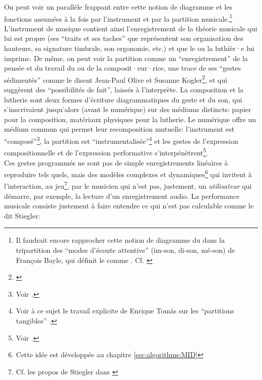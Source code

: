 \indent On peut voir un parallèle frappant entre cette notion de diagramme et les fonctions assumées à la fois par l'instrument et par la partition musicale.\footnote{Il faudrait encore rapprocher cette notion de diagramme du  dans la tripartition des ``modes d'écoute attentive'' (im-son, di-son, mé-son) de François Bayle, qui définit le  comme . Cf. \cite{bayle_musique_1993}} L'instrument de musique contient ainsi l'enregistrement de la théorie musicale qui lui est propre (ses ``traits et ses taches'' que représentent son organisation des hauteurs, sa signature timbrale, son ergonomie, etc.) et que le ou la luthièr·e lui imprime. De même, on peut voir la partition comme un ``enregistrement'' de la pensée et du travail du ou de la composit·eur·rice, une trace de ses ``gestes sédimentés'' comme le disent Jean-Paul Olive et Susanne Kogler\footnote{\cite{olive_expression_2013}}, et qui suggèrent des ``possibilités de fait'', laissés à l'interprète. La composition et la lutherie sont deux formes d’écriture diagrammatiques du geste et du son, qui s’inscrivaient jusqu’alors (avant le numérique) sur des médiums distincts: papier pour la composition, matériaux physiques pour la lutherie. Le numérique offre un médium commun qui permet leur recomposition mutuelle: l'instrument est ``composé''\footnote{Voir \cite{schnell_introducing_2002}.}, la partition est ``instrumentalisée''\footnote{Voir à ce sujet le travail explicite de Enrique Tomás sur les ``partitions tangibles'' \cite{tomas_tangible_2014}.} et les gestes de l'expression compositionnelle et de l'expression performative s'interpénètrent\footnote{Voir \cite{dobrian_e_2006}.}.\\
\indent Ces gestes programmés ne sont pas de simple enregistrements linéaires à reproduire tels quels, mais des modèles complexes et dynamiques\footnote{Cette idée est développée au chapitre \ref{sec:algorithms:MID}} qui invitent à l'interaction, au jeu\footnote{Cf. les propos de Stiegler dans \cite{stiegler_circuit_2004} }, par le musicien qui n'est pas, justement, un \textit{utilisateur} qui démarre, par exemple, la lecture d'un enregistrement audio. La performance musicale consiste justement à faire entendre ce qui n'est pas calculable comme le dit Stiegler: 
